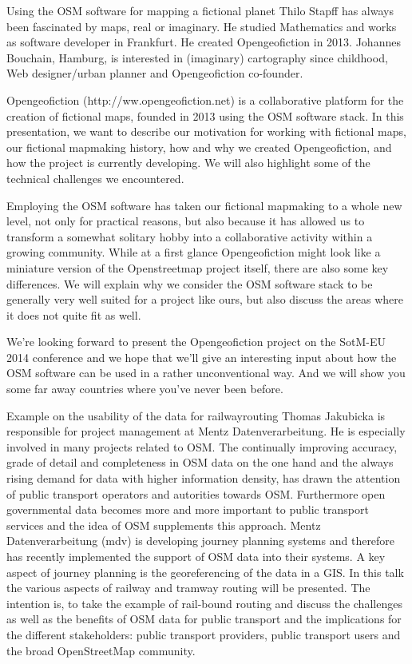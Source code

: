 %
{Using the OSM software for mapping a fictional planet}%
{Thilo Stapff has always been fascinated by maps, real or imaginary. 
He studied Mathematics and works as software developer in Frankfurt. He created
Opengeofiction in 2013. Johannes Bouchain, Hamburg, is interested in
(imaginary) cartography since childhood, Web designer/urban planner and
Opengeofiction co-founder.}%
{Opengeofiction (http://ww.opengeofiction.net) is a collaborative platform for the creation of fictional maps, founded in 2013 using the OSM software stack. In this presentation, we want to describe our motivation for working with fictional maps, our fictional mapmaking history, how and why we created Opengeofiction, and how the project is currently developing. We will also highlight some of the technical challenges we encountered.

Employing the OSM software has taken our fictional mapmaking to a whole new level, not only for practical reasons, but also because it has allowed us to transform a somewhat solitary hobby into a collaborative activity within a growing community. While at a first glance Opengeofiction might look like a miniature version of the Openstreetmap project itself, there are also some key differences. We will explain why we consider the OSM software stack to be generally very well suited for a project like ours, but also discuss the areas where it does not quite fit as well.

We're looking forward to present the Opengeofiction project on the SotM-EU 2014 conference and we hope that we'll give an interesting input about how the OSM software can be used in a rather unconventional way.  And we will show you some far away countries where you’ve never been before.}


%
{Example on the usability of the data for railwayrouting}%
{Thomas Jakubicka is responsible for project management at Mentz Datenverarbeitung. He is especially involved in many projects related to OSM.}%
{The continually improving accuracy, grade of detail and completeness in OSM data on the one hand and the always rising demand for data with higher information density, has drawn the attention of public transport operators and autorities towards OSM. Furthermore open governmental data becomes more and more important to public transport services and the idea of OSM supplements this approach.
Mentz Datenverarbeitung (mdv) is developing journey planning systems and therefore has recently implemented the support of OSM data into their systems. A key aspect of journey planning is the georeferencing of the data in a GIS. In this talk the various aspects of railway and tramway routing will be presented. The intention is, to take the example of rail-bound routing and discuss the challenges as well as the benefits of OSM data for public transport and the implications for the different stakeholders: public transport providers, public transport users and the broad OpenStreetMap community.}



